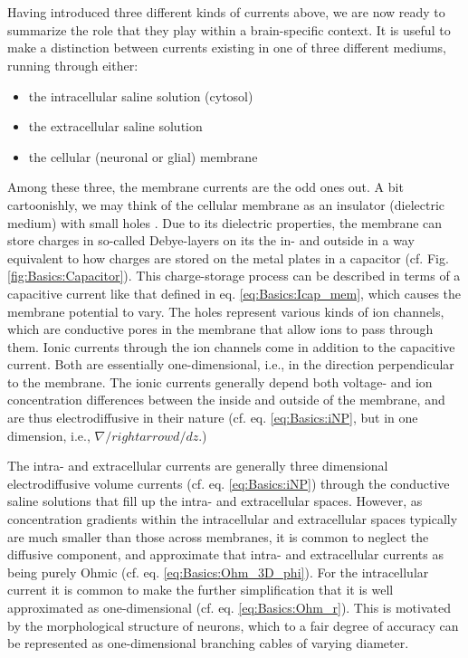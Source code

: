 \section{}
\label{Basics:braincurrents}
Having introduced three different kinds of currents above, we are now ready to summarize the role that they play within a brain-specific context. It is useful to make a distinction between currents existing in one of three different mediums, running through either: 
\begin{itemize}
\item the intracellular saline solution (cytosol)
\item the extracellular saline solution
\item the cellular (neuronal or glial) membrane
\end{itemize}

Among these three, the membrane currents are the odd ones out. A bit cartoonishly, we may think of the cellular membrane as an insulator (dielectric medium) with small holes . Due to its dielectric properties, the membrane can store charges in so-called Debye-layers on its the in- and outside in a way equivalent to how charges are stored on the metal plates in a capacitor (cf. Fig.\ref{fig:Basics:Capacitor}). This charge-storage process can be described in terms of a capacitive current like that defined in eq. \ref{eq:Basics:Icap_mem}, which causes the membrane potential to vary. The holes represent various kinds of ion channels, which are conductive pores in the membrane that allow ions to pass through them. Ionic currents through the ion channels come in addition to the capacitive current. Both are essentially one-dimensional, i.e., in the direction perpendicular to the membrane. The ionic currents generally depend both voltage- and ion concentration differences between the inside and outside of the membrane, and are thus electrodiffusive in their nature (cf. eq. \ref{eq:Basics:iNP}, but in one dimension, i.e., $\nabla /rightarrow d/dz$.) 

The intra- and extracellular currents are generally three dimensional electrodiffusive volume currents (cf. eq. \ref{eq:Basics:iNP}) through the conductive saline solutions that fill up the intra- and extracellular spaces. However, as concentration gradients within the intracellular and extracellular spaces typically are much smaller than those across membranes, it is common to neglect the diffusive component, and approximate that intra- and extracellular currents as being purely Ohmic (cf. eq. \ref{eq:Basics:Ohm_3D_phi}). For the intracellular current it is common to make the further simplification that it is well approximated as one-dimensional (cf. eq. \ref{eq:Basics:Ohm_r}). This is motivated by the morphological structure of neurons, which to a fair degree of accuracy can be represented as one-dimensional branching cables of varying diameter.


